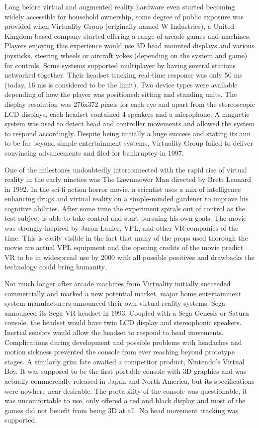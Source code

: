 \documentclass[12pt, a4paper]{article}
\begin{document}
Long before virtual and augmented reality hardware even started becoming widely accessible for household ownership, some degree of public exposure was provided when Virtuality Group (originally named W Industries), a United Kingdom based company started offering a range of arcade games and machines. Players enjoying this experience would use 3D head mounted displays and various joysticks, steering wheels or aircraft yokes (depending on the system and game) for controls. Some systems supported multiplayer by having several stations networked together. Their headset tracking real-time response was only 50 ms (today, 16 ms is considered to be the limit). Two device types were available depending of how the player was positioned: sitting and standing units. The display resolution was 276x372 pixels for each eye and apart from the stereoscopic LCD displays, each headset contained 4 speakers and a microphone. A magnetic system was used to detect head and controller movements and allowed the system to respond accordingly. Despite being initially a huge success and stating its aim to be far beyond simple entertainment systems, Virtuality Group failed to deliver convincing advancements and filed for bankruptcy in 1997.

One of the milestones undoubtedly interconnected with the rapid rise of virtual reality in the early nineties was The Lawnmower Man directed by Brett Leonard in 1992. In the sci-fi action horror movie, a scientist uses a mix of intelligence enhancing drugs and virtual reality on a simple-minded gardener to improve his cognitive abilities. After some time the experiment spirals out of control as the test subject is able to take control and start pursuing his own goals. The movie was strongly inspired by Jaron Lanier, VPL, and other VR companies of the time. This is easily visible in the fact that many of the props used thorough the movie are actual VPL equipment and the opening credits of the movie predict VR to be in widespread use by 2000 with all possible positives and drawbacks the technology could bring humanity.

Not much longer after arcade machines from Virtuality initially succeeded commercially and marked a new potential market, major home entertainment system manufacturers announced their own virtual reality systems. Sega announced its Sega VR headset in 1993. Coupled with a Sega Genesis or Saturn console, the headset would have twin LCD display and stereophonic speakers. Inertial sensors would allow the headset to respond to head movements. Complications during development and possible problems with headaches and motion sickness prevented the console from ever reaching beyond prototype stages. A similarly grim fate awaited a competitor product, Nintendo’s Virtual Boy. It was supposed to be the first portable console with 3D graphics and was actually commercially released in Japan and North America, but its specifications were nowhere near desirable. The portability of the console was questionable, it was uncomfortable to use, only offered a red and black display and most of the games did not benefit from being 3D at all. No head movement tracking was supported.
\end{document}
